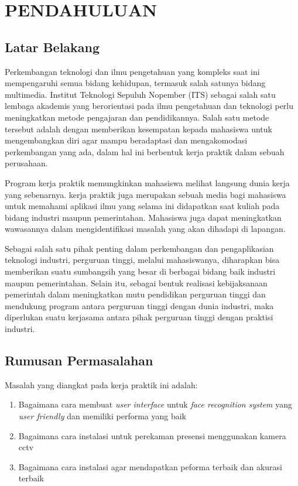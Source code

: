 \chapter{PENDAHULUAN}


\section{Latar Belakang}

  Perkembangan teknologi dan ilmu pengetahuan yang kompleks saat ini mempengaruhi semua bidang kehidupan, termasuk salah satunya bidang multimedia. Institut Teknologi Sepuluh Nopember (ITS) sebagai salah satu lembaga akademis yang berorientasi pada ilmu pengetahuan dan teknologi perlu meningkatkan metode pengajaran dan pendidikannya. Salah satu metode tersebut adalah dengan memberikan kesempatan kepada mahasiswa untuk mengembangkan diri agar mampu beradaptasi dan mengakomodasi perkembangan yang ada, dalam hal ini berbentuk kerja praktik dalam sebuah perusahaan.
  
  Program kerja praktik memungkinkan mahasiswa melihat langsung dunia kerja yang sebenarnya. kerja praktik juga merupakan sebuah media bagi mahasiswa untuk memahami aplikasi ilmu yang selama ini didapatkan saat kuliah pada bidang industri maupun pemerintahan. Mahasiswa juga dapat meningkatkan wawasannya dalam mengidentifikasi masalah yang akan dihadapi di lapangan.

  
  Sebagai salah satu pihak penting dalam perkembangan dan pengaplikasian teknologi industri, perguruan tinggi, melalui mahasiswanya, diharapkan bisa memberikan suatu sumbangsih yang besar di berbagai bidang baik industri maupun pemerintahan. Selain itu, sebagai bentuk realisasi kebijaksanaan pemerintah dalam meningkatkan mutu pendidikan perguruan tinggi dan mendukung program  antara perguruan tinggi dengan dunia industri, maka diperlukan suatu kerjasama antara pihak perguruan tinggi dengan praktisi industri.


\section{Rumusan Permasalahan}

Masalah yang diangkat pada kerja praktik ini adalah:

\begin{enumerate}[nolistsep]

  \item Bagaimana cara membuat \textit{user interface} untuk \textit{face recognition system} yang \textit{user friendly} dan memiliki performa yang baik
  
  \item Bagaimana cara instalasi  untuk perekaman presensi menggunakan kamera cctv

  \item Bagaimana cara instalasi  agar mendapatkan peforma terbaik dan akurasi terbaik

\end{enumerate}

